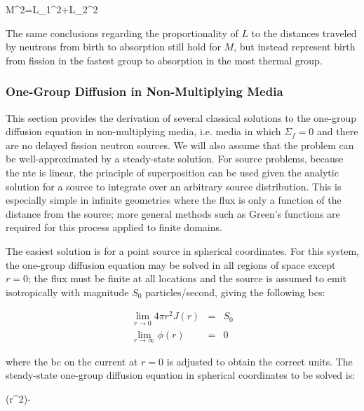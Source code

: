 \beq
M^2=L_1^2+L_2^2
\eeq

The same conclusions regarding the proportionality of \(L\) to the distances traveled by neutrons from birth to absorption still hold for \(M\), but instead represent birth from fission in the fastest group to absorption in the most thermal group.

\subsubsection{One-Group Diffusion in Non-Multiplying Media}
\label{sec:NonMultiplyingDiffusion}
This section provides the derivation of several classical solutions to the one-group diffusion equation in non-multiplying media, i.e. media in which \(\Sigma_f=0\) and there are no delayed fission neutron sources. We will also assume that the problem can be well-approximated by a steady-state solution. For source problems, because the \gls{nte} is linear, the principle of superposition can be used given the analytic solution for a source to integrate over an arbitrary source distribution. This is especially simple in infinite geometries where the flux is only a function of the distance from the source; more general methods such as Green's functions are required for this process applied to finite domains.

\label{sec:1GDEPtSrcSpherical}
The easiest solution is for a point source in spherical coordinates. For this system, the one-group diffusion equation may be solved in all regions of space except \(r=0\); the flux must be finite at all locations and the source is assumed to emit isotropically with magnitude \(S_0\) particles/second, giving the following \glspl{bc}:

\begin{subequations}
\label{eq:1GDESphericalBCs}
\begin{eqnarray}
\lim_{r\rightarrow 0}4\pi r^2J(r)&=&S_0\\
\lim_{r\rightarrow\infty}\phi(r)&=&0
\end{eqnarray}
\end{subequations}

where the \gls{bc} on the current at \(r=0\) is adjusted to obtain the correct units. The steady-state one-group diffusion equation in spherical coordinates to be solved is:

\beq
\label{eq:1GDESpherical}
\left(r^2\right)-
\eeq

